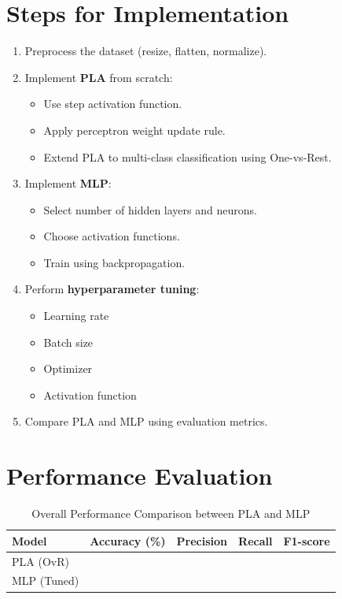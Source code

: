 \documentclass[11pt]{article}
\begin{document}
\section*{Steps for Implementation}

\begin{enumerate}[label=\arabic*.]
    \item Preprocess the dataset (resize, flatten, normalize).
    \item Implement \textbf{PLA} from scratch:
    \begin{itemize}
        \item Use step activation function.
        \item Apply perceptron weight update rule.
        \item Extend PLA to multi-class classification using One-vs-Rest.
    \end{itemize}
    \item Implement \textbf{MLP}:
    \begin{itemize}
        \item Select number of hidden layers and neurons.
        \item Choose activation functions.
        \item Train using backpropagation.
    \end{itemize}
    \item Perform \textbf{hyperparameter tuning}:
    \begin{itemize}
        \item Learning rate
        \item Batch size
        \item Optimizer
        \item Activation function
    \end{itemize}
    \item Compare PLA and MLP using evaluation metrics.
\end{enumerate}

\section*{Performance Evaluation}

\begin{table}[h!]
\centering
\caption{Overall Performance Comparison between PLA and MLP}
\renewcommand{\arraystretch}{1.3}
\begin{tabular}{lcccc}
\toprule
\textbf{Model} & \textbf{Accuracy (\%)} & \textbf{Precision} & \textbf{Recall} & \textbf{F1-score} \\
\midrule
PLA (OvR) &  &  &  &  \\
MLP (Tuned) &  &  &  &  \\
\bottomrule
\end{tabular}
\end{table}
\end{document}
